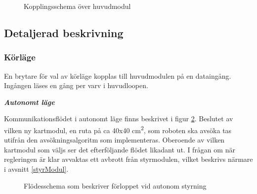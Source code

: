 \documentclass[11pt]{article}
\begin{document}
\begin{flushleft}
\begin{figure}[htbp]
\centering
\noindent{}
	\caption{Kopplingsschema över huvudmodul \label{kopplingsschema:huvudmodul}}	
\end{figure}

\subsection{Detaljerad beskrivning}

\subsubsection {Körläge}
En brytare för val av körläge kopplas till huvudmodulen på en dataingång. Ingången läses en gång per varv i huvudloopen.

\textbf{\textit{Autonomt läge}}

Kommunikationsflödet i autonomt läge finns beskrivet i figur \ref{autonomousMode}. Beslutet av vilken ny kartmodul, en ruta på ca 40x40 cm\textsuperscript{2}, som roboten ska avsöka tas utifrån den avsökningsalgoritm som implementeras. Oberoende av vilken kartmodul som väljs ser det efterföljande flödet likadant ut. I frågan om när regleringen är klar avvaktas ett avbrott från styrmodulen, vilket beskrivs närmare i avsnitt \ref{styrModul}.

\begin{figure}[htbp]
\centering
\noindent\resizebox{0.9\linewidth}{!}{
	}
	\cprotect\caption{Flödesschema som beskriver förloppet vid autonom styrning \label{autonomousMode}}	
\end{figure}


\end{flushleft}
\end{document}
